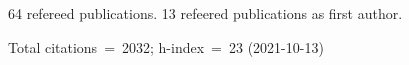 64 refereed publications. 13 refeered publications as first author.

Total citations~=~2032; h-index~=~23 (2021-10-13)